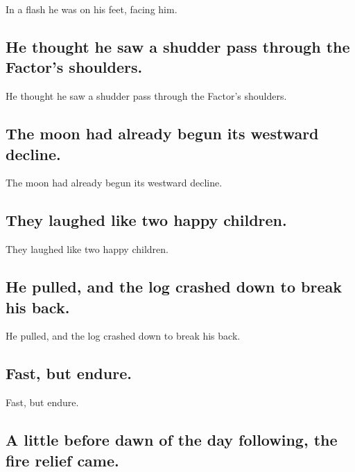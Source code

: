 \documentclass[]{article}
\begin{document}
In a flash he was on his feet, facing him.

\hypertarget{he-thought-he-saw-a-shudder-pass-through-the-factors-shoulders.}{%
\subsection{He thought he saw a shudder pass through the Factor's
shoulders.}\label{he-thought-he-saw-a-shudder-pass-through-the-factors-shoulders.}}

He thought he saw a shudder pass through the Factor's shoulders.

\hypertarget{the-moon-had-already-begun-its-westward-decline.}{%
\subsection{The moon had already begun its westward
decline.}\label{the-moon-had-already-begun-its-westward-decline.}}

The moon had already begun its westward decline.

\hypertarget{they-laughed-like-two-happy-children.}{%
\subsection{They laughed like two happy
children.}\label{they-laughed-like-two-happy-children.}}

They laughed like two happy children.

\hypertarget{he-pulled-and-the-log-crashed-down-to-break-his-back.}{%
\subsection{He pulled, and the log crashed down to break his
back.}\label{he-pulled-and-the-log-crashed-down-to-break-his-back.}}

He pulled, and the log crashed down to break his back.

\hypertarget{fast-but-endure.}{%
\subsection{Fast, but endure.}\label{fast-but-endure.}}

Fast, but endure.

\hypertarget{a-little-before-dawn-of-the-day-following-the-fire-relief-came.}{%
\subsection{A little before dawn of the day following, the fire relief
came.}\label{a-little-before-dawn-of-the-day-following-the-fire-relief-came.}}
\end{document}
